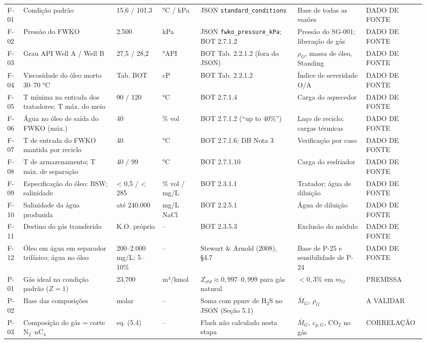 \documentclass[11pt,a4paper]{article}
\numberwithin{equation}{section}
\numberwithin{table}{section}
\numberwithin{figure}{section}
\newcommand{\tipo}[1]{\textsf{\footnotesize #1}}
\newcommand{\AV}{\textcolor{red!70!black}{\tipo{A VALIDAR}}}
\begin{document}
\begin{landscape}
\begin{longtable}{lL{5.2cm}L{2.4cm}lL{5.4cm}L{4.0cm}l}
F-01 & Condição padrão & 15,6 / 101,3 & °C / kPa & JSON \texttt{standard\_conditions} & Base de todas as vazões & \tipo{DADO DE FONTE}\\
F-02 & Pressão do FWKO & 2.500 & kPa & JSON \texttt{fwko\_pressure\_kPa}; BOT 2.7.1.2 & Pressão do SG-001; liberação de gás & \tipo{DADO DE FONTE}\\
F-03 & Grau API Well A / Well B & 27,5 / 28,2 & °API & BOT Tab. 2.2.1.2 (fora do JSON) & $\rho_O$, massa de óleo, Standing & \tipo{DADO DE FONTE}\\
F-04 & Viscosidade do óleo morto 30--70 °C & Tab. BOT & cP & BOT Tab. 2.2.1.2 & Índice de severidade O/A & \tipo{DADO DE FONTE}\\
F-05 & T mínima na entrada dos tratadores; T máx. do meio & 90 / 120 & °C & BOT 2.7.1.4 & Carga do aquecedor & \tipo{DADO DE FONTE}\\
F-06 & Água no óleo de saída do FWKO (máx.) & 40 & \% vol & BOT 2.7.1.2 (``up to 40\%'') & Laço de reciclo; cargas térmicas & \tipo{DADO DE FONTE}\\
F-07 & T de entrada do FWKO mantida por reciclo & 40 & °C & BOT 2.7.1.6; DB Nota 3 & Verificação por caso & \tipo{DADO DE FONTE}\\
F-08 & T de armazenamento; T máx. de separação & 40 / 99 & °C & BOT 2.7.1.10 & Carga do resfriador & \tipo{DADO DE FONTE}\\
F-09 & Especificação do óleo: BSW; salinidade & < 0,5 / < 285 & \% vol / mg/L & BOT 2.3.1.1 & Tratador; água de diluição & \tipo{DADO DE FONTE}\\
F-10 & Salinidade da água produzida & até 240.000 & mg/L NaCl & BOT 2.2.5.1 & Água de diluição & \tipo{DADO DE FONTE}\\
F-11 & Destino do gás transferido & K.O. próprio & -- & BOT 2.3.5.3 & Exclusão do módulo & \tipo{DADO DE FONTE}\\
F-12 & Óleo em água em separador trifásico; água no óleo & 200--2.000 mg/L; 5--10\% & -- & Stewart \& Arnold (2008), §4.7 & Base de P-25 e sensibilidade de P-24 & \tipo{DADO DE FONTE}\\
P-01 & Gás ideal na condição padrão ($Z=1$) & 23{,}700 & m³/kmol & $Z_{std}\approx 0{,}997$--$0{,}999$ para gás natural & $<0{,}3$\% em $\dot m_G$ & \tipo{PREMISSA}\\
P-02 & Base das composições & molar & -- & Soma com ppmv de H$_2$S no JSON (Seção 5.1) & $\bar M_G$, $\rho_G$ & \AV\\
P-03 & Composição do gás = corte N$_2$--nC$_4$ & eq. (5.4) & -- & Flash não calculado nesta etapa & $\bar M_G$, $c_{p,G}$, CO$_2$ no gás & \tipo{CORRELAÇÃO}\\

\end{longtable}
\end{landscape}
\end{document}
